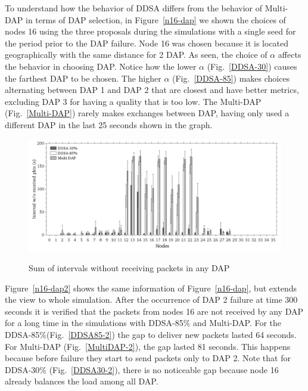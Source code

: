 \documentclass[conference]{IEEEtran}
\begin{document}
To understand how the behavior of DDSA differs from the behavior of Multi-DAP in terms of DAP selection, in Figure~\ref{n16-dap} we shown the choices of nodes 16 using the three proposals during the simulations with a single seed for the period prior to the DAP failure. Node 16 was chosen because it is located geographically with the same distance for 2 DAP. 
As seen, the choice of $\alpha$ affects the behavior in choosing DAP. Notice how the lower $\alpha$ (Fig.~\ref{DDSA-30}) causes the farthest DAP to be chosen.
The higher $\alpha$ (Fig.~\ref{DDSA-85}) makes choices alternating between DAP 1 and DAP 2 that are closest and have better metrics, excluding DAP 3 for having a quality that is too low.
The Multi-DAP (Fig.~\ref{Multi-DAP}) rarely makes exchanges between DAP, having only used a different DAP in the last 25 seconds shown in the graph.
\begin{figure}[ht]
  \centering
  \label{intv-dap}{\includegraphics[scale=.21]{IEEE-consolidados/G-wo-rcv-pkt.jpg}} 
  \caption{Sum of intervals without receiving packets in any DAP}
  \label{sum-intv}
\end{figure}

Figure~\ref{n16-dap2} shows the same information of Figure~\ref{n16-dap}, but extends the view to whole simulation. 
After the occurrence of DAP 2 failure at time 300 seconds it is verified that the packets from nodes 16 are not received by any DAP for a long time in the simulations with DDSA-85\% and Multi-DAP.
For the DDSA-85\%(Fig.~\ref{DDSA85-2}) the gap to deliver new packets lasted 64 seconds. For Multi-DAP (Fig.~\ref{MultiDAP-2}), the gap lasted 81 seconds. This happens because before failure they start to send packets only to DAP 2. Note that for DDSA-30\% (Fig.~\ref{DDSA30-2}), there is no noticeable gap because node 16 already balances the load among all DAP.
\end{document}

